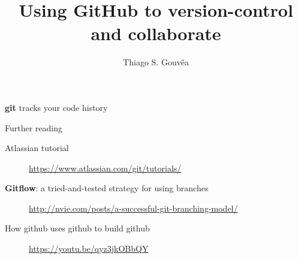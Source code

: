 \documentclass[11pt]{beamer}
\author{Thiago S. Gouvêa}
\title{Using GitHub to version-control and collaborate}
\begin{document}
\begin{frame}
\titlepage
\end{frame}


\begin{frame}{\textbf{git} tracks your code history}


\end{frame}

\begin{frame}{Further reading}
\begin{description}
\item[Atlassian tutorial]{\url{https://www.atlassian.com/git/tutorials/}}
\item[\textbf{Gitflow}: a tried-and-tested strategy for using branches]{\url{http://nvie.com/posts/a-successful-git-branching-model/}}
\item[How github uses github to build github]{\url{https://youtu.be/qyz3jkOBbQY}}
\end{description}


\end{frame}
\end{document}
